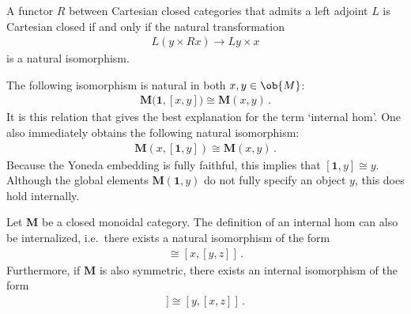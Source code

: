     \begin{property}
        A functor $R$ between Cartesian closed categories that admits a left adjoint $L$ is Cartesian closed if and only if the natural transformation
        \begin{gather}
            L(y\times Rx)\rightarrow Ly\times x
        \end{gather}
        is a natural isomorphism.
    \end{property}

    \begin{property}\label{cat:internal_hom_property}
        The following isomorphism is natural in both $x,y\in\ob{M}$:
        \begin{gather}
            \mathbf{M}\bigl(\mathbf{1},[x,y]\bigr)\cong\mathbf{M}(x,y)\,.
        \end{gather}
        It is this relation that gives the best explanation for the term `internal hom'. One also immediately obtains the following natural isomorphism:
        \begin{gather}
            \mathbf{M}(x,[\mathbf{1},y])\cong\mathbf{M}(x,y)\,.
        \end{gather}
        Because the Yoneda embedding is fully faithful, this implies that $[\mathbf{1},y]\cong y$. Although the global elements $\mathbf{M}(\mathbf{1},y)$ do not fully specify an object $y$, this does hold internally.
    \end{property}

    \begin{property}[Symmetry]\label{cat:internal_symmetry}
        Let $\mathbf{M}$ be a closed monoidal category. The definition of an internal hom can also be internalized, i.e.~there exists a natural isomorphism of the form
        \begin{gather}
            [x\otimes y,z]\cong[x,[y,z]]\,.
        \end{gather}
        Furthermore, if $\mathbf{M}$ is also symmetric, there exists an internal isomorphism of the form
        \begin{gather}
            [x,[y,z]]\cong[y,[x,z]]\,.
        \end{gather}
    \end{property}

